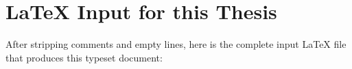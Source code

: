 
\chapter* {\LaTeX{} Input for this Thesis}

After stripping comments and empty lines, here is the complete input
\LaTeX{} file that produces this typeset document:

\begin{footnotesize}
\end{footnotesize}
